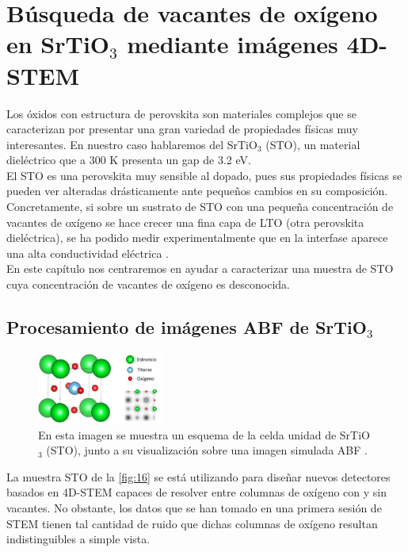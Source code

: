 \section{Búsqueda de vacantes de oxígeno en SrTiO$_3$ mediante imágenes 4D-STEM}


Los óxidos con estructura de perovskita son materiales complejos que se caracterizan por presentar una gran variedad de propiedades físicas muy interesantes. En nuestro caso hablaremos del SrTiO$_3$ (STO), un material dieléctrico que a 300 K presenta un gap de 3.2 eV.\\

El STO es una perovskita muy sensible al dopado, pues sus propiedades físicas se pueden ver alteradas drásticamente ante pequeños cambios en su composición. Concretamente, si sobre un sustrato de STO con una pequeña concentración de vacantes de oxígeno se hace crecer una fina capa de LTO (otra perovskita dieléctrica), se ha podido medir experimentalmente que en la interfase aparece una alta conductividad eléctrica \cite{STO}.\\

En este capítulo nos centraremos en ayudar a caracterizar una muestra de STO cuya concentración de vacantes de oxígeno es desconocida.

\subsection{Procesamiento de imágenes ABF de SrTiO$_3$}

\begin{figure}
    \includegraphics[width=0.37\textwidth]{fig/Fig15.png}
    \caption{En esta imagen se muestra un esquema de la celda unidad de SrTiO$_3$ (STO), junto a su visualización sobre una imagen simulada ABF \cite{paquito}.}
    \label{fig:15}
\end{figure} 

La muestra STO de la \autoref{fig:16} se está utilizando para diseñar nuevos detectores basados en 4D-STEM capaces de resolver entre columnas de oxígeno con y sin vacantes. No obstante, los datos que se han tomado en una primera sesión de STEM tienen tal cantidad de ruido que dichas columnas de oxígeno resultan indistinguibles a simple vista.\\

